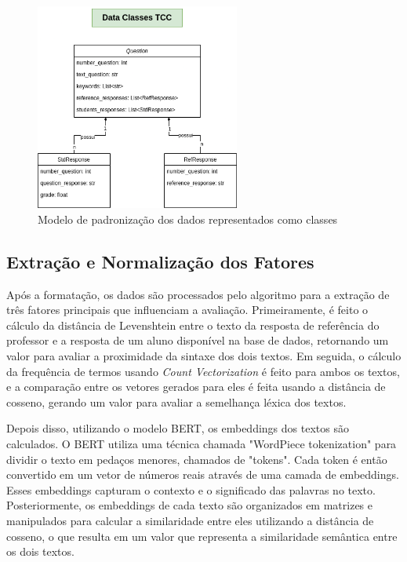 \begin{figure}[h!]
\centering
\includegraphics[width=0.6\textwidth]{img/DataClassModelsTCC.png}
\caption{Modelo de padronização dos dados representados como classes}\label{figure:28}
\end{figure}

\FloatBarrier

\subsection{Extração e Normalização dos Fatores}

Após a formatação, os dados são processados pelo algoritmo para a extração de três fatores principais que influenciam a avaliação. Primeiramente, é feito o cálculo da distância de Levenshtein entre o texto da resposta de referência do professor e a resposta de um aluno disponível na base de dados, retornando um valor para avaliar a proximidade da sintaxe dos dois textos. Em seguida, o cálculo da frequência de termos usando \textit{Count Vectorization} é feito para ambos os textos, e a comparação entre os vetores gerados para eles é feita usando a distância de cosseno, gerando um valor para avaliar a semelhança léxica dos textos.

Depois disso, utilizando o modelo BERT, os embeddings dos textos são calculados. O BERT utiliza uma técnica chamada "WordPiece tokenization" para dividir o texto em pedaços menores, chamados de "tokens". Cada token é então convertido em um vetor de números reais através de uma camada de embeddings. Esses embeddings capturam o contexto e o significado das palavras no texto. Posteriormente, os embeddings de cada texto são organizados em matrizes e manipulados para calcular a similaridade entre eles utilizando a distância de cosseno, o que resulta em um valor que representa a similaridade semântica entre os dois textos.

